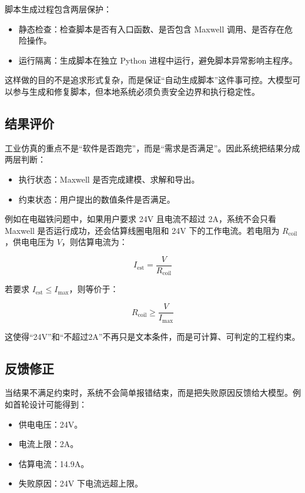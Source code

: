 \documentclass[12pt,a4paper]{ctexart}
\begin{document}
脚本生成过程包含两层保护：

\begin{itemize}
  \item 静态检查：检查脚本是否有入口函数、是否包含 Maxwell 调用、是否存在危险操作。
  \item 运行隔离：生成脚本在独立 Python 进程中运行，避免脚本异常影响主程序。
\end{itemize}

这样做的目的不是追求形式复杂，而是保证“自动生成脚本”这件事可控。大模型可以参与生成和修复脚本，但本地系统必须负责安全边界和执行稳定性。

\subsection{结果评价}

工业仿真的重点不是“软件是否跑完”，而是“需求是否满足”。因此系统把结果分成两层判断：

\begin{itemize}
  \item 执行状态：Maxwell 是否完成建模、求解和导出。
  \item 约束状态：用户提出的数值条件是否满足。
\end{itemize}

例如在电磁铁问题中，如果用户要求 24V 且电流不超过 2A，系统不会只看 Maxwell 是否运行成功，还会估算线圈电阻和 24V 下的工作电流。若电阻为 $R_{\mathrm{coil}}$，供电电压为 $V$，则估算电流为：

\[
I_{\mathrm{est}} = \frac{V}{R_{\mathrm{coil}}}
\]

若要求 $I_{\mathrm{est}} \leq I_{\max}$，则等价于：

\[
R_{\mathrm{coil}} \geq \frac{V}{I_{\max}}
\]

这使得“24V”和“不超过2A”不再只是文本条件，而是可计算、可判定的工程约束。

\subsection{反馈修正}

当结果不满足约束时，系统不会简单报错结束，而是把失败原因反馈给大模型。例如首轮设计可能得到：

\begin{itemize}
  \item 供电电压：24V。
  \item 电流上限：2A。
  \item 估算电流：14.9A。
  \item 失败原因：24V 下电流远超上限。
\end{itemize}
\end{document}

